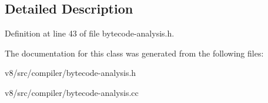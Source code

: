 \subsection{Detailed Description}


Definition at line 43 of file bytecode-\/analysis.\+h.



The documentation for this class was generated from the following files\+:\begin{DoxyCompactItemize}
\item 
v8/src/compiler/bytecode-\/analysis.\+h\item 
v8/src/compiler/bytecode-\/analysis.\+cc\end{DoxyCompactItemize}
